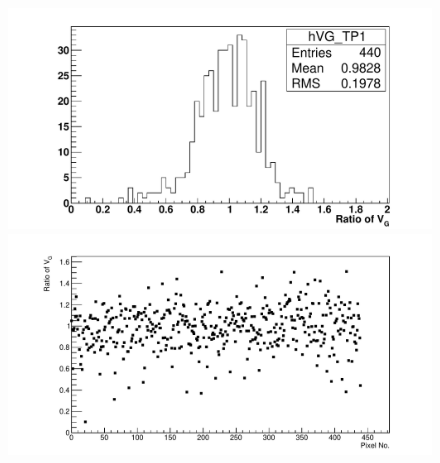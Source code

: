 \begin{figure} %
\includegraphics[width=\textwidth]{chapters/graphs/GainVarsMeas/LL_m04_2016-06-11/Set0and2/GainVairanceHist_Average_Method1.pdf}
\caption{}\label{fig:GainVarsRatioHist_Average}
\vspace{3mm}
\includegraphics[width=\textwidth]{chapters/graphs/GainVarsMeas/LL_m04_2016-06-11/Set0and2/GainVars_Vs_Pixel_GainVariance_Average_Method1_Set0and2.pdf}
\caption{}\label{fig:GainsVarsRatioVsPixel_Average}
\end{figure}

